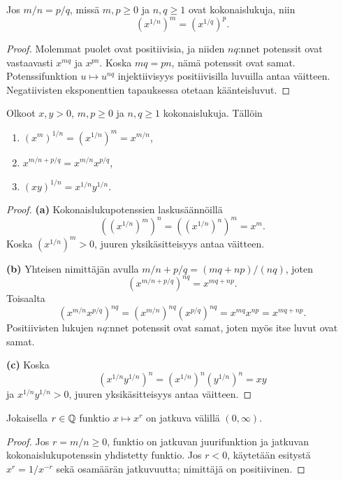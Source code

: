 \documentclass[11pt,a4paper]{amsart}
\begin{document}
\begin{lemma}
  Jos $m/n=p/q$, missä $m,p\ge0$ ja $n,q\ge1$ ovat
  kokonaislukuja, niin
  \[
    \left(x^{1/n}\right)^m=\left(x^{1/q}\right)^p.
  \]
\end{lemma}
\begin{proof}
  Molemmat puolet ovat positiivisia, ja niiden $nq$:nnet
  potenssit ovat vastaavasti $x^{mq}$ ja $x^{pn}$.
  Koska $mq=pn$, nämä potenssit ovat samat.
  Potenssifunktion $u\mapsto u^{nq}$ injektiivisyys
  positiivisilla luvuilla antaa väitteen.
  Negatiivisten eksponenttien tapauksessa otetaan käänteisluvut.
\end{proof}

\newpage
\begin{theorem}
  Olkoot $x,y>0$, $m,p\ge0$ ja $n,q\ge1$ kokonaislukuja.
  Tällöin
  \begin{enumerate}[label=\textup{(\alph*)}]
    \item $\displaystyle (x^m)^{1/n}=(x^{1/n})^m=x^{m/n}$,
    \item $\displaystyle x^{m/n+p/q}=x^{m/n}x^{p/q}$,
    \item $\displaystyle (xy)^{1/n}=x^{1/n}y^{1/n}$.
  \end{enumerate}
\end{theorem}
\begin{proof}
  \textbf{(a)} Kokonaislukupotenssien laskusäännöillä
  \[
    \left((x^{1/n})^m\right)^n
    =\left((x^{1/n})^n\right)^m=x^m.
  \]
  Koska $(x^{1/n})^m>0$, juuren yksikäsitteisyys antaa väitteen.

  \smallskip
  \noindent\textbf{(b)} Yhteisen nimittäjän avulla
  $m/n+p/q=(mq+np)/(nq)$, joten
  \[
    \left(x^{m/n+p/q}\right)^{nq}=x^{mq+np}.
  \]
  Toisaalta
  \[
    \left(x^{m/n}x^{p/q}\right)^{nq}
    =\left(x^{m/n}\right)^{nq}\left(x^{p/q}\right)^{nq}
    =x^{mq}x^{np}=x^{mq+np}.
  \]
  Positiivisten lukujen $nq$:nnet potenssit ovat samat,
  joten myös itse luvut ovat samat.

  \smallskip
  \noindent\textbf{(c)} Koska
  \[
    \left(x^{1/n}y^{1/n}\right)^n
    =\left(x^{1/n}\right)^n\left(y^{1/n}\right)^n=xy
  \]
  ja $x^{1/n}y^{1/n}>0$, juuren yksikäsitteisyys antaa väitteen.
\end{proof}

\begin{corollary}
  Jokaisella $r\in\mathbb{Q}$ funktio $x\mapsto x^r$ on jatkuva
  välillä $(0,\infty)$.
\end{corollary}
\begin{proof}
  Jos $r=m/n\ge0$, funktio on jatkuvan juurifunktion ja
  jatkuvan kokonaislukupotenssin yhdistetty funktio.
  Jos $r<0$, käytetään esitystä $x^r=1/x^{-r}$ sekä
  osamäärän jatkuvuutta; nimittäjä on positiivinen.
\end{proof}
\end{document}
